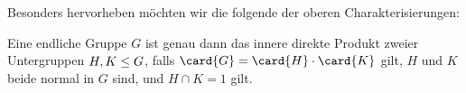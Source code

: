 Besonders hervorheben möchten wir die folgende der oberen Charakterisierungen:

\begin{corollary}
  Eine endliche Gruppe $G$ ist genau dann das innere direkte Produkt zweier Untergruppen $H, K \leq G$, falls $\card{G} = \card{H} \cdot \card{K}$ gilt, $H$ und $K$ beide normal in $G$ sind, und $H \cap K = 1$ gilt.
\end{corollary}

